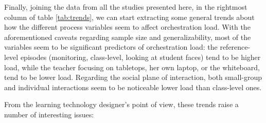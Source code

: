 \documentclass[10pt,journal,compsoc]{IEEEtran}
\begin{document}
Finally, joining the data from all the studies presented here, in the rightmost column of table \ref{tab:trends}, we can start extracting some general trends about how the different process variables seem to affect orchestration load. With the aforementioned caveats regarding sample size and generalizability, most of the variables seem to be significant predictors of orchestration load: the reference-level episodes (monitoring, class-level, looking at student faces) tend to be higher load, while the teacher focusing on tabletops, her own laptop, or the whiteboard, tend to be lower load. Regarding the social plane of interaction, both small-group and individual interactions seem to be noticeable lower load than class-level ones.

From the learning technology designer's point of view, these trends raise a number of interesting issues:
\end{document}
